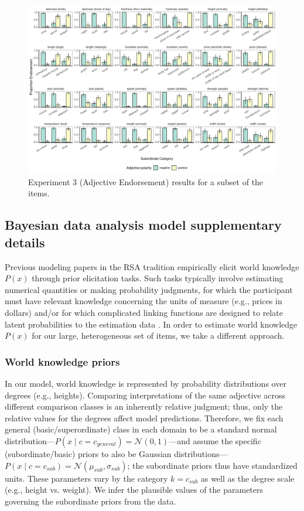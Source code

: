 \documentclass[doc]{apa6}
\begin{document}
\begin{figure}[t!]
\centering
\includegraphics[width=\textwidth]{figs/bars_adj_finalExpt_pilot_byItem.pdf}
\caption{Experiment 3 (Adjective Endorsement) results for a subset of the items.}\label{fig:adjEndorseItems}
\end{figure}

\subsection{Bayesian data analysis model supplementary details}

Previous modeling papers in the RSA tradition empirically elicit world knowledge $P(x)$ through prior elicitation tasks.
Such tasks typically involve estimating numerical quantities or making probability judgments, for which the participant must have relevant knowledge concerning the units of measure (e.g., prices in dollars) and/or for which complicated linking functions are designed to relate latent probabilities to the estimation data \cite{Franke2016}. 
In order to estimate world knowledge $P(x)$ for our large, heterogeneous set of items, we take a different approach.

\subsubsection{World knowledge priors}

In our model, world knowledge is represented by probability distributions over degrees (e.g., heights).
Comparing interpretations of the same adjective across different comparison classes is an inherently relative judgment; thus, only the relative values for the degrees affect model predictions. 
Therefore, we fix each general (basic/superordinate) class in each domain to be a standard normal distribution---$P(x \mid c = c_{general}) = \mathcal{N}(0, 1)$---and assume the specific (subordinate/basic) priors to also be Gaussian distributions---\(P(x \mid c = c_{sub}) = \mathcal{N}(\mu_{sub}, \sigma_{sub})\); the subordinate priors thus have standardized units.
These parameters vary by the category $k = c_{sub}$ as well as the degree scale (e.g., height vs. weight).
We infer the plausible values of the parameters governing the subordinate priors from the data.
\end{document}
